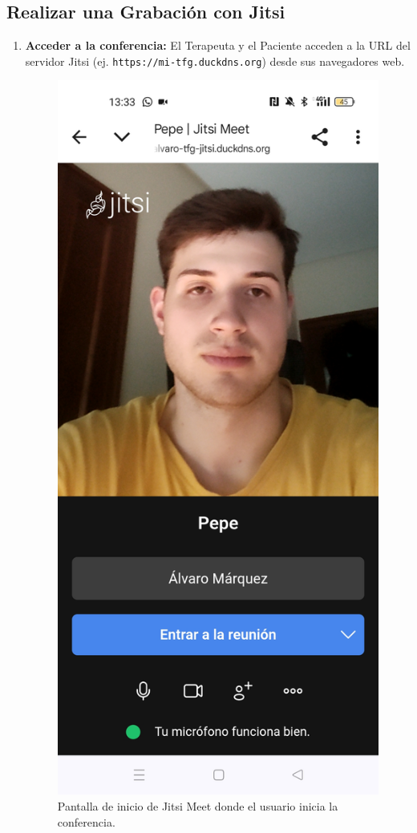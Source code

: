 \subsection{Realizar una Grabación con Jitsi}
\begin{enumerate}
    \item \textbf{Acceder a la conferencia:} El Terapeuta y el Paciente acceden a la URL del servidor Jitsi (ej. \texttt{https://mi-tfg.duckdns.org}) desde sus navegadores web.

    \begin{figure}[H]
    \centering
    \includegraphics[height=0.6\textheight]{img/entrarreunion.jpg}
    \caption{Pantalla de inicio de Jitsi Meet donde el usuario inicia la conferencia.}
    \label{fig:manual_entrar_reunion}
    \end{figure}
    

\end{enumerate}
